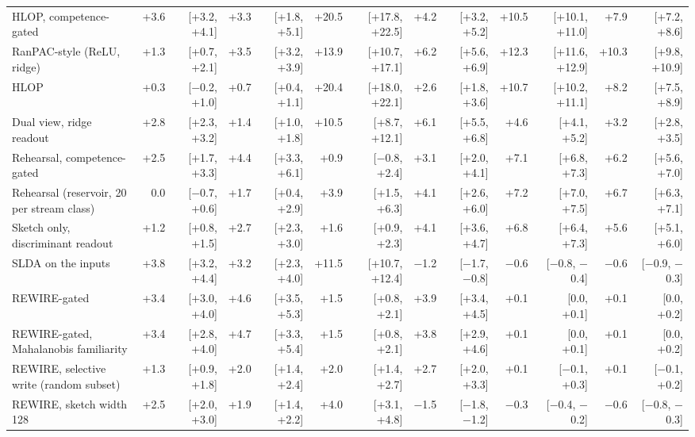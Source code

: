 \begin{tabular*}{\textheight}{@{\extracolsep{\fill}}lrrrrrrrrrrrr@{}}
HLOP, competence-gated & +3.6 & [+3.2, +4.1] & +3.3 & [+1.8, +5.1] & +20.5 & [+17.8, +22.5] & +4.2 & [+3.2, +5.2] & +10.5 & [+10.1, +11.0] & +7.9 & [+7.2, +8.6] \\
RanPAC-style (ReLU, ridge) & +1.3 & [+0.7, +2.1] & +3.5 & [+3.2, +3.9] & +13.9 & [+10.7, +17.1] & +6.2 & [+5.6, +6.9] & +12.3 & [+11.6, +12.9] & +10.3 & [+9.8, +10.9] \\
HLOP & +0.3 & [\ensuremath{-}0.2, +1.0] & +0.7 & [+0.4, +1.1] & +20.4 & [+18.0, +22.1] & +2.6 & [+1.8, +3.6] & +10.7 & [+10.2, +11.1] & +8.2 & [+7.5, +8.9] \\
Dual view, ridge readout & +2.8 & [+2.3, +3.2] & +1.4 & [+1.0, +1.8] & +10.5 & [+8.7, +12.1] & +6.1 & [+5.5, +6.8] & +4.6 & [+4.1, +5.2] & +3.2 & [+2.8, +3.5] \\
Rehearsal, competence-gated & +2.5 & [+1.7, +3.3] & +4.4 & [+3.3, +6.1] & +0.9 & [\ensuremath{-}0.8, +2.4] & +3.1 & [+2.0, +4.1] & +7.1 & [+6.8, +7.3] & +6.2 & [+5.6, +7.0] \\
Rehearsal (reservoir, 20 per stream class) & 0.0 & [\ensuremath{-}0.7, +0.6] & +1.7 & [+0.4, +2.9] & +3.9 & [+1.5, +6.3] & +4.1 & [+2.6, +6.0] & +7.2 & [+7.0, +7.5] & +6.7 & [+6.3, +7.1] \\
Sketch only, discriminant readout & +1.2 & [+0.8, +1.5] & +2.7 & [+2.3, +3.0] & +1.6 & [+0.9, +2.3] & +4.1 & [+3.6, +4.7] & +6.8 & [+6.4, +7.3] & +5.6 & [+5.1, +6.0] \\
SLDA on the inputs & +3.8 & [+3.2, +4.4] & +3.2 & [+2.3, +4.0] & +11.5 & [+10.7, +12.4] & \ensuremath{-}1.2 & [\ensuremath{-}1.7, \ensuremath{-}0.8] & \ensuremath{-}0.6 & [\ensuremath{-}0.8, \ensuremath{-}0.4] & \ensuremath{-}0.6 & [\ensuremath{-}0.9, \ensuremath{-}0.3] \\
REWIRE-gated & +3.4 & [+3.0, +4.0] & +4.6 & [+3.5, +5.3] & +1.5 & [+0.8, +2.1] & +3.9 & [+3.4, +4.5] & +0.1 & [0.0, +0.1] & +0.1 & [0.0, +0.2] \\
REWIRE-gated, Mahalanobis familiarity & +3.4 & [+2.8, +4.0] & +4.7 & [+3.3, +5.4] & +1.5 & [+0.8, +2.1] & +3.8 & [+2.9, +4.6] & +0.1 & [0.0, +0.1] & +0.1 & [0.0, +0.2] \\
REWIRE, selective write (random subset) & +1.3 & [+0.9, +1.8] & +2.0 & [+1.4, +2.4] & +2.0 & [+1.4, +2.7] & +2.7 & [+2.0, +3.3] & +0.1 & [\ensuremath{-}0.1, +0.3] & +0.1 & [\ensuremath{-}0.1, +0.2] \\
REWIRE, sketch width 128 & +2.5 & [+2.0, +3.0] & +1.9 & [+1.4, +2.2] & +4.0 & [+3.1, +4.8] & \ensuremath{-}1.5 & [\ensuremath{-}1.8, \ensuremath{-}1.2] & \ensuremath{-}0.3 & [\ensuremath{-}0.4, \ensuremath{-}0.2] & \ensuremath{-}0.6 & [\ensuremath{-}0.8, \ensuremath{-}0.3] \\

\end{tabular*}
